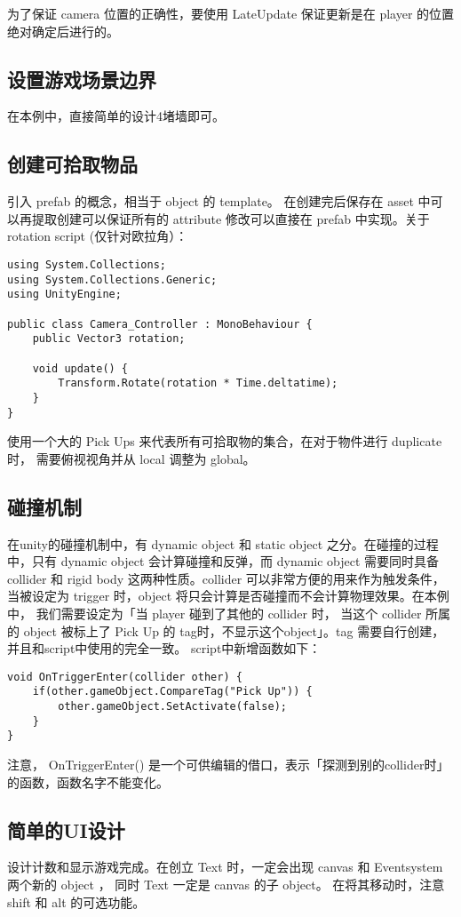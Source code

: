 \documentclass[10pt, a4paper]{article}
\begin{document}
            为了保证 camera 位置的正确性，要使用 LateUpdate 保证更新是在 player 的位置绝对确定后进行的。

        \subsection{设置游戏场景边界}
            在本例中，直接简单的设计4堵墙即可。
        \subsection{创建可拾取物品}
            引入 prefab 的概念，相当于 object 的 template。 在创建完后保存在 asset 中可以再提取创建可以保证所有的 attribute 修改可以直接在 prefab 中实现。关于 rotation script (仅针对欧拉角）：
\begin{lstlisting}
using System.Collections; 
using System.Collections.Generic;
using UnityEngine;
    
public class Camera_Controller : MonoBehaviour {
    public Vector3 rotation;

    void update() {
        Transform.Rotate(rotation * Time.deltatime);
    }
}
\end{lstlisting}

            使用一个大的 Pick Ups 来代表所有可拾取物的集合，在对于物件进行 duplicate 时， 需要俯视视角并从 local 调整为 global。
        
        \subsection{碰撞机制}
            在unity的碰撞机制中，有 dynamic object 和 static object 之分。在碰撞的过程中，只有 dynamic object 会计算碰撞和反弹，而 dynamic object 需要同时具备 collider 和 rigid body 这两种性质。collider 可以非常方便的用来作为触发条件，当被设定为 trigger 时，object 将只会计算是否碰撞而不会计算物理效果。在本例中， 我们需要设定为「当 player 碰到了其他的 collider 时， 当这个 collider 所属的 object 被标上了 Pick Up 的 tag时，不显示这个object」。tag 需要自行创建，并且和script中使用的完全一致。 script中新增函数如下： 
\begin{lstlisting}
void OnTriggerEnter(collider other) {
    if(other.gameObject.CompareTag("Pick Up")) {
        other.gameObject.SetActivate(false);
    }
}
\end{lstlisting}

            注意， OnTriggerEnter() 是一个可供编辑的借口，表示「探测到别的collider时」的函数，函数名字不能变化。
        \subsection{简单的UI设计} 
            设计计数和显示游戏完成。在创立 Text 时，一定会出现 canvas 和 Eventsystem 两个新的 object ， 同时 Text 一定是 canvas 的子 object。 在将其移动时，注意 shift 和 alt 的可选功能。
            
\end{document}
